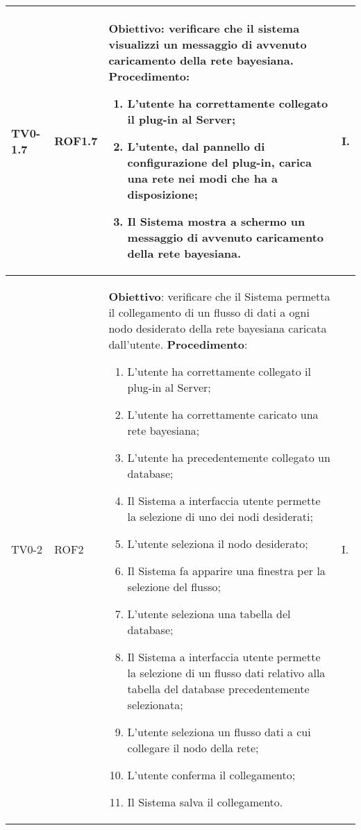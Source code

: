 \begin{longtable}{|C{.15\textwidth}|C{.13\textwidth}|m{.52\textwidth}|C{.08\textwidth}|}
TV0-1.7 & ROF1.7 &
	\textbf{Obiettivo}: verificare che il sistema visualizzi un messaggio di avvenuto caricamento della rete bayesiana. \newline
	\textbf{Procedimento}:
	\begin{enumerate}
		\item L'utente ha correttamente collegato il plug-in al Server;
		\item L'utente, dal pannello di configurazione del plug-in, carica una rete nei modi che ha a disposizione;
		\item Il Sistema mostra a schermo un messaggio di avvenuto caricamento della rete bayesiana.
	\end{enumerate} & I. \\
\hline

TV0-2 & ROF2 &
	\textbf{Obiettivo}: verificare che il Sistema permetta il collegamento di un flusso di dati a ogni nodo desiderato della rete bayesiana caricata dall'utente. \newline
	\textbf{Procedimento}:
	\begin{enumerate}
		\item L'utente ha correttamente collegato il plug-in al Server;
		\item L'utente ha correttamente caricato una rete bayesiana;
		\item L'utente ha precedentemente collegato un database;
		\item Il Sistema a interfaccia utente permette la selezione di uno dei nodi desiderati;
		\item L'utente seleziona il nodo desiderato;
		\item Il Sistema fa apparire una finestra per la selezione del flusso;
		\item L'utente seleziona una tabella del database;
		\item Il Sistema a interfaccia utente permette la selezione di un flusso dati relativo alla tabella del database precedentemente selezionata;
		\item L'utente seleziona un flusso dati a cui collegare il nodo della rete;
		\item L'utente conferma il collegamento;
		\item Il Sistema salva il collegamento.
	\end{enumerate}
	& I. \\
\hline


\end{longtable}
